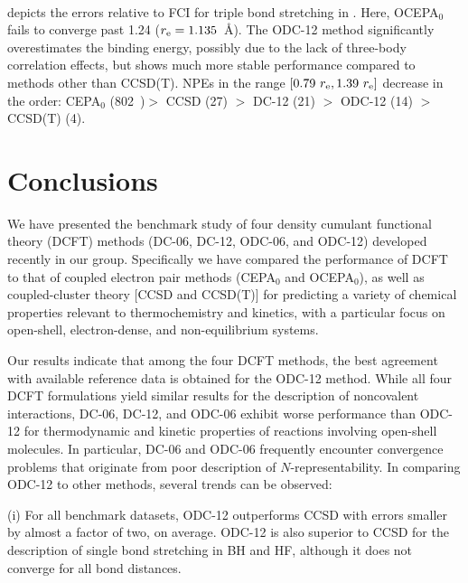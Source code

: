 \paragraph{}
 depicts the errors relative to FCI for triple bond stretching in
.
Here, OCEPA$_0$ fails to converge past 1.24 \re ($r_\mathrm{e} = 1.135$~\AA).
The ODC-12 method significantly overestimates the binding energy, possibly due
to the lack of three-body correlation effects, but shows much more stable
performance compared to methods other than CCSD(T).
NPEs in the range $[0.79\ \re, 1.39\ \re]$ decrease in the order:
CEPA$_0$ (802~\mhartree)\footnotemark $>$
CCSD     (27) $>$
DC-12    (21) $>$
ODC-12   (14) $>$
CCSD(T)  (4).


\section{Conclusions}

We have presented the benchmark study of four density cumulant functional theory
(DCFT) methods (DC-06, DC-12, ODC-06, and ODC-12) developed recently in our
group.\cite{Simmonett:2010p174122,Sokolov:2012p054105,Sokolov:2013p024107,Sokolov:2013p204110}
Specifically we have compared the performance of DCFT to that of coupled
electron pair methods (CEPA$_0$ and OCEPA$_0$), as well as coupled-cluster
theory [CCSD and CCSD(T)] for predicting a variety of chemical properties
relevant to thermochemistry and kinetics, with a particular focus on open-shell,
electron-dense, and non-equilibrium systems.

Our results indicate that among the four DCFT methods, the best agreement with
available reference data is obtained for the ODC-12 method.
While all four DCFT formulations yield similar results for the description of
noncovalent interactions, DC-06, DC-12, and ODC-06 exhibit worse performance
than ODC-12 for thermodynamic and kinetic properties of reactions involving
open-shell molecules.
In particular, DC-06 and ODC-06 frequently encounter convergence problems that
originate from poor description of $N$-representability.
In comparing ODC-12 to other methods, several trends can be observed: 

(i) For all benchmark datasets, ODC-12 outperforms CCSD with errors smaller by
almost a factor of two, on average.
ODC-12 is also superior to CCSD for the description of single bond stretching in
BH and HF, although it does not converge for all bond distances.

